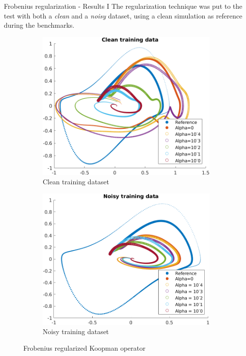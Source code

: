 \documentclass{beamer}
\begin{document}
\begin{frame}{Frobenius regularization - Results I}
    The regularization technique was put to the test with both a \textit{clean} and a \textit{noisy} dataset, using a clean simulation as reference during the benchmarks.

    \begin{figure}
        \centering
        \begin{subfigure}[b]{0.45\textwidth}
            \centering
            \includegraphics[width=\textwidth]{Clean_Training.png}
            \caption{Clean training dataset}
            \label{fig:Koopman_clean}
        \end{subfigure}
        \hfill
        \begin{subfigure}[b]{0.45\textwidth}
            \centering
            \includegraphics[width=\textwidth]{Noisy_Training.png}
            \caption{Noisy training dataset}
            \label{fig:Koopman_noisy}
        \end{subfigure}
        \caption{Frobenius regularized Koopman operator}
        \label{fig:Koopman_Frobenius}
    \end{figure}
\end{frame}
\end{document}

